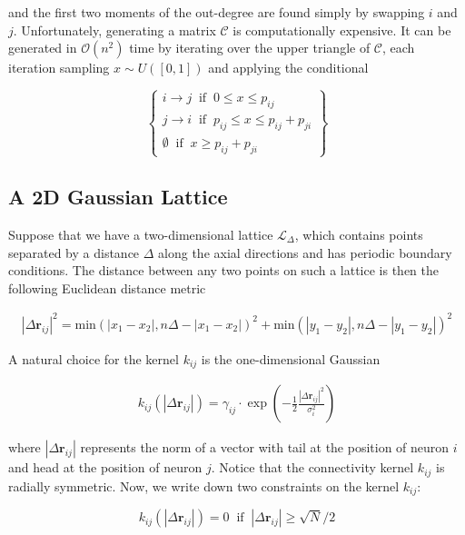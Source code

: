 \documentclass{ucetd}
\begin{document}
and the first two moments of the out-degree are found simply by swapping $i$ and $j$. Unfortunately, generating a matrix $\mathcal{C}$ is computationally expensive. It can be generated in $\mathcal{O}(n^{2})$ time by iterating over the upper triangle of $\mathcal{C}$, each iteration sampling $x\sim U([0,1])$ and applying the conditional

  \[
    \left\{\begin{array}{lr}
        i\rightarrow j \;\;\mathrm{if}\;\; 0 \leq x \leq p_{ij}\\
        j\rightarrow i \;\;\mathrm{if}\;\; p_{ij} \leq x \leq p_{ij}+p_{ji}\\
        \emptyset \;\; \mathrm{if} \;\; x \geq p_{ij}+p_{ji}
        \end{array}\right\}
  \]


\subsection{A 2D Gaussian Lattice}

Suppose that we have a two-dimensional lattice $\mathcal{L}_{\Delta}$, which contains points separated by a distance $\Delta$ along the axial directions and has periodic boundary conditions. The distance between any two points on such a lattice is then the following Euclidean distance metric

\begin{align*}
|\Delta\mathbf{r}_{ij}|^{2} = \mathrm{min}(|x_1 - x_2|, n\Delta - |x_1 - x_2|)^2 + \mathrm{min}(|y_1 - y_2|, n\Delta - |y_1 - y_2|)^2
\end{align*}

A natural choice for the kernel $k_{ij}$ is the one-dimensional Gaussian

\begin{align*}
k_{ij}(|\Delta\mathbf{r}_{ij}|) = \gamma_{ij}\cdot \exp\left(-\frac{1}{2}\frac{|\Delta\mathbf{r}_{ij}|^{2}}{\sigma_{i}^{2}} \right)
\end{align*}

where $|\Delta\mathbf{r}_{ij}|$ represents the norm of a vector with tail at the position of neuron $i$ and head at the position of neuron $j$. Notice that the connectivity kernel $k_{ij}$ is radially symmetric. Now, we write down two constraints on the kernel $k_{ij}$: 

\begin{equation}
k_{ij}(|\Delta\mathbf{r}_{ij}|) = 0 \;\; \mathrm{if} \;\; |\Delta\mathbf{r}_{ij}| \geq \sqrt{N}/2
\end{equation}
\end{document}
